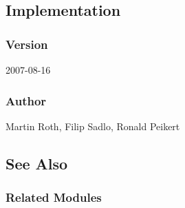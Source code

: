 \subsection{Implementation}


\subsubsection{Version}

2007-08-16


\subsubsection{Author}

Martin Roth, Filip Sadlo, Ronald Peikert


\subsection{See Also}


\subsubsection{Related Modules}


